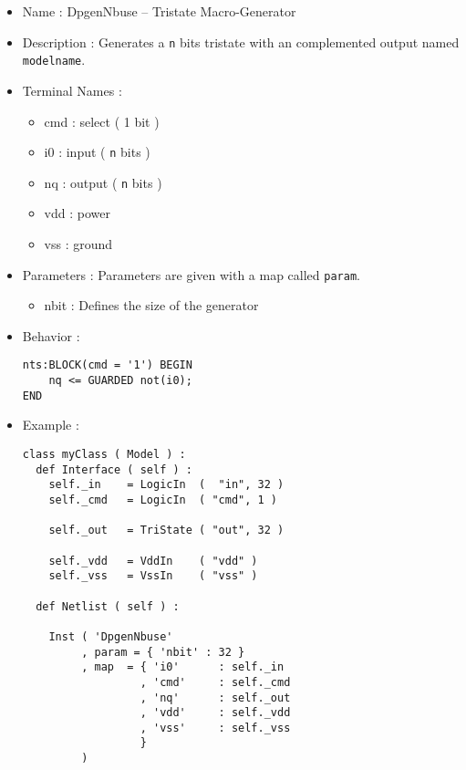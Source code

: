 \begin{itemize}
    \item Name : DpgenNbuse -- Tristate Macro-Generator
    \item Description : Generates a \verb-n- bits tristate with an complemented output named \verb-modelname-.
    \item Terminal Names :
    \begin{itemize}
        \item cmd : select ( 1 bit )
        \item i0 : input ( \verb-n- bits )
        \item nq : output ( \verb-n- bits )
        \item vdd : power
        \item vss : ground
    \end{itemize}
    \item Parameters : Parameters are given with a map called \verb-param-.
    \begin{itemize}
        \item nbit : Defines the size of the generator
    \end{itemize}
    \item Behavior :
\begin{verbatim}
nts:BLOCK(cmd = '1') BEGIN
    nq <= GUARDED not(i0);
END
\end{verbatim}
    \item Example :
\begin{verbatim}
class myClass ( Model ) :
  def Interface ( self ) :
    self._in    = LogicIn  (  "in", 32 )
    self._cmd   = LogicIn  ( "cmd", 1 )
    
    self._out   = TriState ( "out", 32 )

    self._vdd   = VddIn    ( "vdd" )
    self._vss   = VssIn    ( "vss" )
    
  def Netlist ( self ) :
      
    Inst ( 'DpgenNbuse'
         , param = { 'nbit' : 32 }
         , map  = { 'i0'      : self._in
                  , 'cmd'     : self._cmd
                  , 'nq'      : self._out
                  , 'vdd'     : self._vdd
                  , 'vss'     : self._vss
                  }
         )
\end{verbatim}
\end{itemize}
